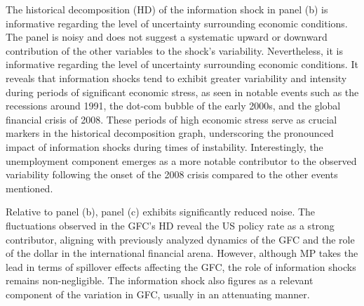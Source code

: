 \documentclass[11pt,a4paper]{article}
\begin{document}
The historical decomposition (HD) of the information shock in panel (b) is informative regarding the level of uncertainty surrounding economic conditions. 
The panel is noisy and does not suggest a systematic upward or downward contribution of the other variables to the shock's variability. 
Nevertheless, it is informative regarding the level of uncertainty surrounding economic conditions. 
It reveals that information shocks tend to exhibit greater variability and intensity during periods of significant economic stress, as seen in notable events such as the recessions around 1991, the dot-com bubble of the early 2000s, and the global financial crisis of 2008. These periods of high economic stress serve as crucial markers in the historical decomposition graph, underscoring the pronounced impact of information shocks during times of instability.
Interestingly, the unemployment component emerges as a more notable contributor to the observed variability following the onset of the 2008 crisis compared to the other events mentioned. %



Relative to panel (b), panel (c) exhibits significantly reduced noise. 
The fluctuations observed in the GFC's HD reveal the US policy rate as a strong contributor, aligning with previously analyzed dynamics of the GFC and the role of the dollar in the international financial arena. 
However, although MP takes the lead in terms of spillover effects affecting the GFC, the role of information shocks remains non-negligible.
The information shock also figures as a relevant component of the variation in GFC, usually in an attenuating manner. %
\end{document}
